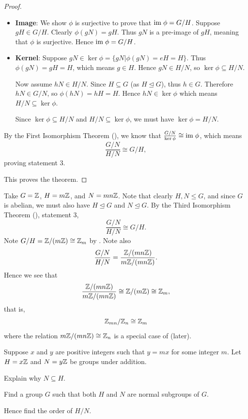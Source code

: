 \begin{proof}
\begin{enumerate}
\begin{itemize}
            \item \textbf{Image}: We show $\phi$ is surjective to prove that $\mathrm{im}\;\phi = G/H$. Suppose $gH \in G/H$. Clearly $\phi(gN) = gH$. Thus $gN$ is a pre-image of $gH$, meaning that $\phi$ is surjective. Hence $\mathrm{im}\;\phi = G/H$.

            \item \textbf{Kernel}: Suppose $gN \in \ker\phi = \{gN \vert \phi(gN) = eH = H\}$. Thus $\phi(gN) = gH = H$, which means $g \in H$. Hence $gN \in H/N$, so $\ker\phi \subseteq H/N$.

            Now assume $hN \in H/N$. Since $H\subseteq G$ (as $H \unlhd G$), thus $h \in G$. Therefore $hN \in G/N$, so $\phi(hN) = hH = H$. Hence $hN \in \ker\phi$ which means $H/N \subseteq \ker\phi$.

            Since $\ker\phi \subseteq H/N$ and $H/N \subseteq \ker\phi$, we must have $\ker\phi = H/N$.
        \end{itemize}

        By the First Isomorphism Theorem (), we know that $\frac{G/N}{\ker\phi} \cong \mathrm{im}\;\phi$, which means
        \[
            \frac{G/N}{H/N} \cong G/H,
        \]
        proving statement 3.
    \end{enumerate}
    This proves the theorem.
\end{proof}

\begin{example}
    Take $G = \mathbb{Z}$, $H = m\mathbb{Z}$, and $N = mn\mathbb{Z}$. Note that clearly $H, N \leq G$, and since $G$ is abelian, we must also have $H \unlhd G$ and $N \unlhd G$. By the Third Isomorphism Theorem (), statement 3,
    \[
        \frac{G/N}{H/N} \cong G/H.
    \]
    Note $G/H = \mathbb{Z}/(m\mathbb{Z}) \cong \mathbb{Z}_m$ by . Note also
    \[
        \frac{G/N}{H/N} = \frac{\mathbb{Z}/(mn\mathbb{Z})}{m\mathbb{Z}/(mn\mathbb{Z})}.
    \]
    Hence we see that
    \[
        \frac{\mathbb{Z}/(mn\mathbb{Z})}{m\mathbb{Z}/(mn\mathbb{Z})} \cong \mathbb{Z}/(m\mathbb{Z}) \cong \mathbb{Z}_m,
    \]
    that is,
    \[
        \mathbb{Z}_{mn}/\mathbb{Z}_n \cong \mathbb{Z}_m
    \]
    where the relation $m\mathbb{Z}/(mn\mathbb{Z}) \cong \mathbb{Z}_n$ is a special case of  (later).
\end{example}

\begin{exercise}
    Suppose $x$ and $y$ are positive integers such that $y = mx$ for some integer $m$. Let $H = x\mathbb{Z}$ and $N = y\mathbb{Z}$ be groups under addition.
    \begin{partquestions}{\roman*}
        \item Explain why $N \subseteq H$.
        \item Find a group $G$ such that both $H$ and $N$ are normal subgroups of $G$.
        \item Hence find the order of $H/N$.
    \end{partquestions}
\end{exercise}


